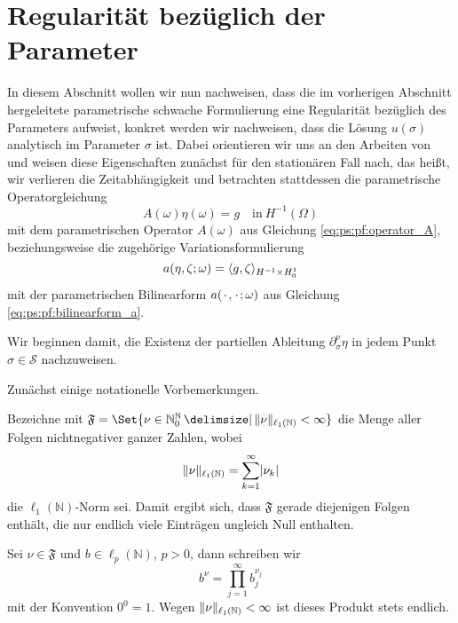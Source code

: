 

\section{Regularität bezüglich der Parameter} %
\label{sec:ps:rg:regularitaet_bezueglich_der_parameter}


In diesem Abschnitt wollen wir nun nachweisen, dass die im vorherigen Abschnitt hergeleitete parametrische schwache Formulierung eine Regularität bezüglich des Parameters aufweist, konkret werden wir nachweisen, dass die Lösung $u(\sigma)$ analytisch im Parameter $\sigma$ ist.
Dabei orientieren wir uns an den Arbeiten von \textcite{Cohen:2010kz,Kunoth:2013ef} und weisen diese Eigenschaften zunächst für den stationären Fall nach, das heißt, wir verlieren die Zeitabhängigkeit und betrachten stattdessen die parametrische Operatorgleichung
\begin{equation}
\label{eq:ps:rg:operatorgleichung_parametrisch}
    A(\omega) \eta(\omega) = g \quad \text{in}~H^{-1}(\Omega)
\end{equation}
mit dem parametrischen Operator $A(\omega)$ aus Gleichung \cref{eq:ps:pf:operator_A}, beziehungsweise die zugehörige Variationsformulierung
\begin{equation}
\label{eq:ps:rg:variationsformulierung_parametrisch}
    a(\eta, \zeta; \omega) = \langle g,\zeta\rangle_{H^{-1} \times H^{1}_{0}}
\end{equation}
mit der parametrischen Bilinearform $a({\mkern2mu\cdot\mkern2mu}, {\mkern2mu\cdot\mkern2mu}; \omega)$ aus Gleichung \cref{eq:ps:pf:bilinearform_a}.

Wir beginnen damit, die Existenz der partiellen Ableitung $\partial^{\nu}_{\sigma} \eta$ in jedem Punkt $\sigma \in \mathcal S$ nachzuweisen.

Zunächst einige notationelle Vorbemerkungen.
\begin{Bemerkung}
    Bezeichne mit $\mathfrak F = \Set{ \nu \in \mathbb{N}^{\mathbb{N}}_{0} \given \norm{\nu}_{\ell_{1}(\mathbb{N})} < \infty }$ die Menge aller Folgen nichtnegativer ganzer Zahlen, wobei
    \begin{equation}
        \lVert\nu\rVert_{\ell_{1}(\mathbb{N})} = \sum_{k = 1}^{\infty} \lvert\nu_{k}\rvert
    \end{equation}
    die $\ell_{1}(\mathbb{N})$-Norm sei.
    Damit ergibt sich, dass $\mathfrak F$ gerade diejenigen Folgen enthält, die nur endlich viele Einträgen ungleich Null enthalten.

    Sei $\nu \in \mathfrak F$ und $b \in \ell_{p}(\mathbb{N})$, $p > 0$, dann schreiben wir
    \begin{equation}
        b^{\nu} = \prod_{j = 1}^{\infty} b_{j}^{\nu_{j}}
    \end{equation}
    mit der Konvention $0^{0} = 1$.
    Wegen $\lVert\nu\rVert_{\ell_{1}(\mathbb{N})} < \infty$ ist dieses Produkt stets endlich.
\end{Bemerkung}

